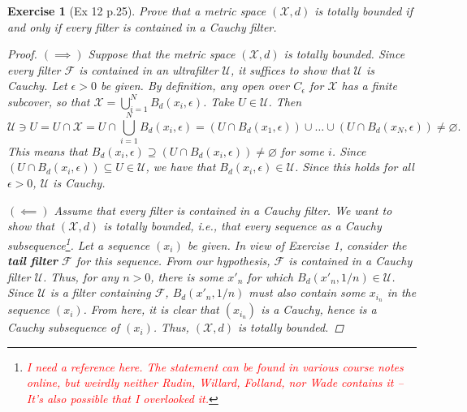 \documentclass[11pt]{article}
\newtheorem{exercise}{Exercise}
\newcommand{\F}{\mathcal{F}}
\newcommand{\X}{\mathcal{X}}
\begin{document}
\begin{exercise}[Ex 12 p.25]
	Prove that a metric space $(\X , d)$ is totally bounded if and only if every filter is contained in a Cauchy filter. 
	\begin{proof}
		$(\implies)$ Suppose that the metric space $(\X,d)$ is totally bounded. Since every filter $\F$ is contained in an ultrafilter $\mathcal{U}$, it suffices to show that $\mathcal{U}$ is Cauchy. Let $\epsilon > 0$ be given. By definition, any open over $C_\epsilon$ for $\X$ has a finite subcover, so that $\X = \bigcup_{i=1}^N B_d(x_i,\epsilon)$.  Take $U\in \mathcal{U}$. Then 
		\begin{equation*}
		\mathcal{U}\ni U = U\cap \X = U \cap \bigcup^N_{i=1} B_d(x_i,\epsilon) = (U \cap B_d(x_1,\epsilon)) \cup \dots \cup (U \cap B_d(x_N,\epsilon)) \neq \varnothing.
		\end{equation*}
		This means that $B_d(x_i, \epsilon) \supseteq (U \cap B_d(x_i,\epsilon)) \neq \varnothing$ for some $i$. Since $(U\cap B_d(x_i,\epsilon)) \subseteq U \in \mathcal{U}$, we have that  $B_d(x_i,\epsilon) \in \mathcal{U}$. Since this holds for all $\epsilon >0$, $\mathcal{U}$ is Cauchy. 
		
		
		$(\impliedby)$ Assume that every filter is contained in a Cauchy filter. We want to show that $(\X,d)$ is totally bounded, i.e., that every sequence as a Cauchy subsequence\footnote{\textcolor{red}{I need a reference here. The statement can be found in various course notes online, but weirdly neither Rudin, Willard, Folland, nor Wade contains it -- It's also possible that I overlooked it.}}. Let a sequence $(x_i)$ be given. In view of Exercise 1, consider the \textbf{tail filter} $\F$ for this sequence. From our hypothesis, $\F$ is contained in a Cauchy filter $\mathcal{U}$. Thus, for any $n > 0$, there is some $x'_n$ for which $B_d(x'_n,1/n)\in \mathcal{U}$. Since $\mathcal{U}$ is a filter containing $\F$, $B_d(x'_n,1/n)$ must also contain some $x_{i_n}$ in the sequence $(x_i)$. From here, it is clear that $(x_{i_n})$ is a Cauchy, hence is a Cauchy subsequence of $(x_i)$. Thus, $(\X,d)$ is totally bounded.
	\end{proof}
\end{exercise}
\end{document}
